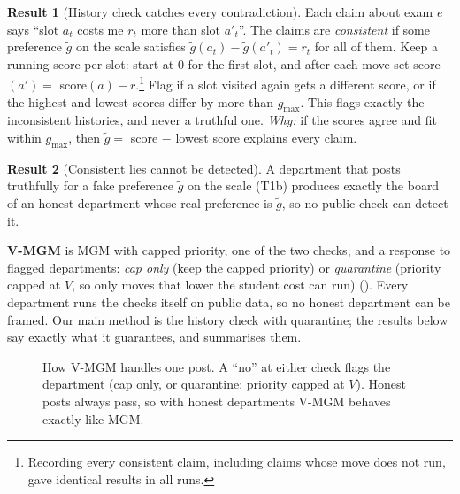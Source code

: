 \documentclass{article}
\theoremstyle{definition}
\newtheorem{result}{Result}
\newcommand{\1}{\mathbf{1}}
\newcommand{\gmax}{g_{\max}}
\begin{document}
\begin{result}[History check catches every contradiction]
\label{res:hist}
Each claim about exam $e$ says ``slot $a_t$ costs me $r_t$ more than slot $a'_t$''. The claims are \emph{consistent} if some preference $\tilde g$ on the scale satisfies $\tilde g(a_t)-\tilde g(a'_t)=r_t$ for all of them. Keep a running score per slot: start at $0$ for the first slot, and after each move set score$(a')=$ score$(a)-r$.\footnote{Recording every consistent claim, including claims whose move does not run, gave identical results in all runs.} %
Flag if a slot visited again gets a different score, or if the highest and lowest scores differ by more than $\gmax$. This flags exactly the inconsistent histories, and never a truthful one. \emph{Why:} if the scores agree and fit within $\gmax$, then $\tilde g=$ score $-$ lowest score explains every claim.
\end{result}

\begin{result}[Consistent lies cannot be detected]
\label{res:undet}
A department that posts truthfully for a fake preference $\tilde g$ on the scale (T1b) produces exactly the board of an honest department whose real preference is $\tilde g$, so no public check can detect it.
\end{result}

\textbf{V-MGM} is MGM with capped priority, one of the two checks, and a response to flagged departments: \emph{cap only} (keep the capped priority) or \emph{quarantine} (priority capped at $V$, so only moves that lower the student cost can run) (). Every department runs the checks itself on public data, so no honest department can be framed. Our main method is the history check with quarantine; the results below say exactly what it guarantees, and  summarises them.

\begin{figure}[!t]
\centering
{}
\caption{How V-MGM handles one post. A ``no'' at either check flags the department (cap only, or quarantine: priority capped at $V$). Honest posts always pass, so with honest departments V-MGM behaves exactly like MGM.}
\label{fig:flow}
\end{figure}
\end{document}
